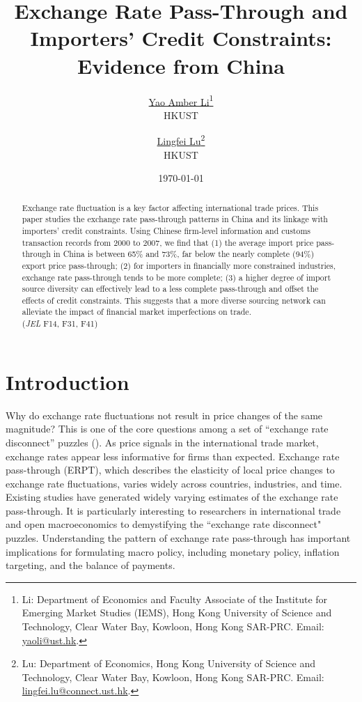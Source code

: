 \documentclass[12pt]{article}
\begin{document}
\title{  \Large \textbf{Exchange Rate Pass-Through and Importers' Credit Constraints: Evidence from China}}

\author{\large \href{http://yaoli.people.ust.hk/}{Yao Amber Li}\thanks{Li: Department of Economics and Faculty Associate of the Institute for Emerging Market Studies (IEMS), Hong Kong University of Science and Technology, Clear Water Bay, Kowloon, Hong Kong SAR-PRC. Email: \href{mailto:yaoli@ust.hk}{yaoli@ust.hk}.}\\ \large{HKUST}
\and \large \href{}{Lingfei Lu}\thanks{Lu: Department of Economics, Hong Kong University of Science and Technology, Clear Water Bay, Kowloon, Hong Kong SAR-PRC. Email: \href{mailto:}{lingfei.lu@connect.ust.hk}.} \\ \large{HKUST}
 }

\date{\today }

\maketitle

\begin{abstract}
Exchange rate fluctuation is a key factor affecting international trade prices. This paper studies the exchange rate pass-through patterns in China and its linkage with importers' credit constraints. Using Chinese firm-level information and customs transaction records from 2000 to 2007, we find that (1) the average import price pass-through in China is between 65\% and 73\%, far below the nearly complete (94\%) export price pass-through; (2) for importers in financially more constrained industries, exchange rate pass-through tends to be more complete; (3) a higher degree of import source diversity can effectively lead to a less complete pass-through and offset the effects of credit constraints. This suggests that a more diverse sourcing network can alleviate the impact of financial market imperfections on trade.\\
(\textit{JEL} F14, F31, F41)

\end{abstract}

\section{Introduction} \label{Introduction}

Why do exchange rate fluctuations not result in price changes of the same magnitude? This is one of the core questions among a set of ``exchange rate disconnect'' puzzles (\cite{obstfeld2000}). As price signals in the international trade market, exchange rates appear less informative for firms than expected. Exchange rate pass-through (ERPT), which describes the elasticity of local price changes to exchange rate fluctuations, varies widely across countries, industries, and time. Existing studies have generated widely varying estimates of the exchange rate pass-through. It is particularly interesting to researchers in international trade and open macroeconomics to demystifying the ``exchange rate disconnect" puzzles. Understanding the pattern of exchange rate pass-through has important implications for formulating macro policy, including monetary policy, inflation targeting, and the balance of payments.
\end{document}
